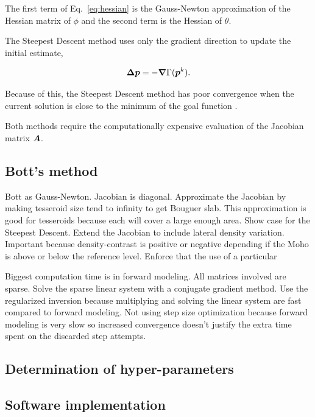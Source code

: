 \documentclass[extra]{gji}
\newcommand{\eq}[1]{Eq.~\ref{eq:#1}}
\newcommand{\mbf}[1]{\hbox{\mathversion{bold}$#1$}}
\begin{document}
\noindent
The first term of \eq{hessian} is the Gauss-Newton approximation of the Hessian
matrix of $\phi$ and the second term is the Hessian of $\theta$.

The Steepest Descent method uses only the gradient direction to
update the initial estimate,

\begin{equation}
    \mbf{\Delta p} = -\mbf{\nabla}\Gamma(\mbf{p}^k).
\end{equation}

\noindent
Because of this, the Steepest Descent method has poor convergence when the
current solution is close to the minimum of the goal function
\citep{kelley_iterative_1987}.

Both methods require the computationally expensive evaluation of the Jacobian
matrix $\mbf{A}$.


\subsection{Bott's method}

Bott as Gauss-Newton.
Jacobian is diagonal.
Approximate the Jacobian by making tesseroid size tend to infinity to get
Bouguer slab.
This approximation is good for tesseroids because each will cover a large
enough area.
Show case for the Steepest Descent.
Extend the Jacobian to include lateral density variation.
Important because density-contrast is positive or negative depending if the
Moho is above or below the reference level.
Enforce that the use of a particular

Biggest computation time is in forward modeling.
All matrices involved are sparse.
Solve the sparse linear system with a conjugate gradient method.
Use the regularized inversion because multiplying and solving the linear system
are fast compared to forward modeling.
Not using step size optimization because forward modeling is very slow so
increased convergence doesn't justify the extra time spent on the discarded
step attempts.

\subsection{Determination of hyper-parameters}



\subsection{Software implementation}
\end{document}
